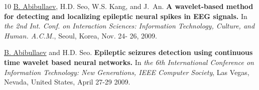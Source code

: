 \documentclass[10pt,letterpaper,sans]{moderncv}   %
\begin{document}
\begin{thebibliography}{10}
	\underline{B. Abibullaev}, H.D. Seo, W.S. Kang, and J.~An.
	\newblock \textbf{A wavelet-based method for detecting and localizing epileptic neural spikes in {EEG} signals.}
	\newblock In {\em the 2nd Int. Conf. on Interaction Sciences: Information Technology, Culture, and Human. A.C.M.}, Seoul, Korea,  Nov. 24- 26, 2009.
	
	\underline{B. Abibullaev} and H.D. Seo.
	\newblock \textbf{Epileptic seizures detection using continuous time wavelet based neural networks.}
	\newblock In {\em the 6th International Conference on Information Technology: New Generations, IEEE Computer Society}, Las Vegas, Nevada, United States, April 27-29 2009.
	
\end{thebibliography}
\vspace{10pt}
\end{document}

